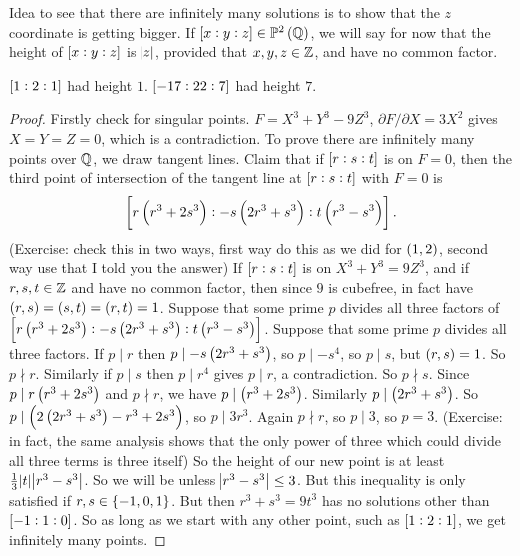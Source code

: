 Idea to see that there are infinitely many solutions is to show that the $ z $ coordinate is getting bigger. If $ \sbr{x : y : z} \in \P^2\br{\Q} $, we will say for now that the height of $ \sbr{x : y : z} $ is $ \abs{z} $, provided that $ x, y, z \in \mathbb{Z} $, and have no common factor.

\begin{example*}
$ \sbr{1 : 2 : 1} $ had height $ 1 $. $ \sbr{-17 : 22 : 7} $ had height $ 7 $.
\end{example*}

\begin{proof}
Firstly check for singular points. $ F = X^3 + Y^3 - 9Z^3 $, $ \partial F / \partial X = 3X^2 $ gives $ X = Y = Z = 0 $, which is a contradiction. To prove there are infinitely many points over $ \mathbb{Q} $, we draw tangent lines. Claim that if $ \sbr{r : s : t} $ is on $ F = 0 $, then the third point of intersection of the tangent line at $ \sbr{r : s : t} $ with $ F = 0 $ is
$$ \sbr{r\br{r^3 + 2s^3} : -s\br{2r^3 + s^3} : t\br{r^3 - s^3}}. $$
(Exercise: check this in two ways, first way do this as we did for $ \br{1, 2} $, second way use that I told you the answer) If $ \sbr{r : s : t} $ is on $ X^3 + Y^3 = 9Z^3 $, and if $ r, s, t \in \mathbb{Z} $ and have no common factor, then since $ 9 $ is cubefree, in fact have $ \br{r, s} = \br{s, t} = \br{r, t} = 1 $. Suppose that some prime $ p $ divides all three factors of $ \sbr{r\br{r^3 + 2s^3} : -s\br{2r^3 + s^3} : t\br{r^3 - s^3}} $. Suppose that some prime $ p $ divides all three factors. If $ p \mid r $ then $ p \mid -s\br{2r^3 + s^3} $, so $ p \mid -s^4 $, so $ p \mid s $, but $ \br{r, s} = 1 $. So $ p \nmid r $. Similarly if $ p \mid s $ then $ p \mid r^4 $ gives $ p \mid r $, a contradiction. So $ p \nmid s $. Since $ p \mid r\br{r^3 + 2s^3} $ and $ p \nmid r $, we have $ p \mid \br{r^3 + 2s^3} $. Similarly $ p \mid \br{2r^3 + s^3} $. So $ p \mid \br{2\br{2r^3 + s^3} - r^3 + 2s^3} $, so $ p \mid 3r^3 $. Again $ p \nmid r $, so $ p \mid 3 $, so $ p = 3 $. (Exercise: in fact, the same analysis shows that the only power of three which could divide all three terms is three itself) So the height of our new point is at least $ \tfrac{1}{3}\abs{t}\abs{r^3 - s^3} $. So we will be unless $ \abs{r^3 - s^3} \le 3 $. But this inequality is only satisfied if $ r, s \in \cbr{-1, 0, 1} $. But then $ r^3 + s^3 = 9t^3 $ has no solutions other than $ \sbr{-1 : 1 : 0} $. So as long as we start with any other point, such as $ \sbr{1 : 2 : 1} $, we get infinitely many points.
\end{proof}

